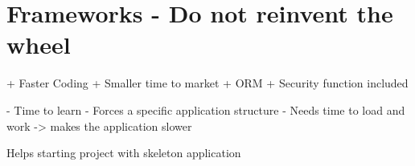 \chapter{Frameworks - Do not reinvent the wheel}

+ Faster Coding
+ Smaller time to market
+ ORM
+ Security function included

- Time to learn
- Forces a specific application structure
- Needs time to load and work -> makes the application slower


Helps starting project with skeleton application
